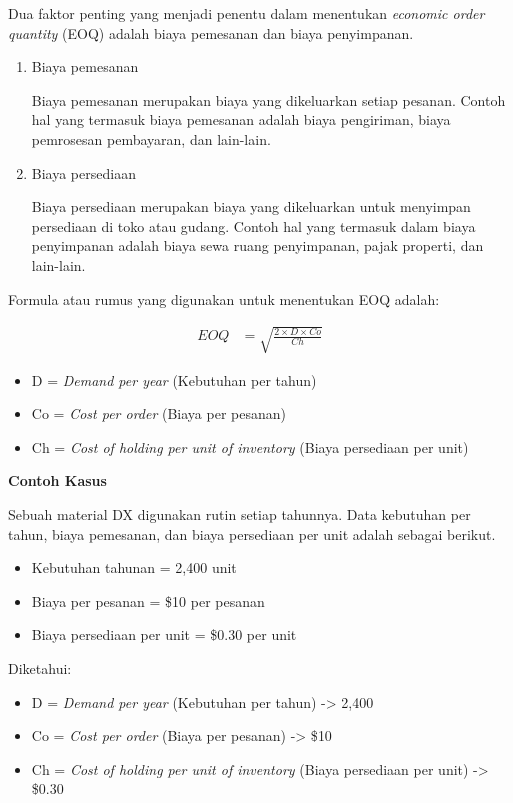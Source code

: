 Dua faktor penting yang menjadi penentu dalam menentukan \textit{economic order quantity} (EOQ) adalah biaya pemesanan dan biaya penyimpanan.

\begin{enumerate}
	\item Biaya pemesanan
	
	Biaya pemesanan merupakan biaya yang dikeluarkan setiap pesanan. Contoh hal yang termasuk biaya pemesanan adalah biaya pengiriman, biaya pemrosesan pembayaran, dan lain-lain.

	\item Biaya persediaan
	
	Biaya persediaan merupakan biaya yang dikeluarkan untuk menyimpan persediaan di toko atau gudang. Contoh hal yang termasuk dalam biaya penyimpanan adalah biaya sewa ruang penyimpanan, pajak properti, dan lain-lain.
\end{enumerate}

Formula atau rumus yang digunakan untuk menentukan EOQ adalah:

\begin{equation}
    \begin{split}
		EOQ
		&= \sqrt{\frac{2 \times D \times Co}{Ch}}
    \end{split}
\end{equation}

\begin{itemize}
	\item D = \textit{Demand per year} (Kebutuhan per tahun)
	\item Co = \textit{Cost per order} (Biaya per pesanan)
	\item Ch = \textit{Cost of holding per unit of inventory} (Biaya persediaan per unit)
\end{itemize}

\textbf{Contoh Kasus}

Sebuah material DX digunakan rutin setiap tahunnya. Data kebutuhan per tahun, biaya pemesanan, dan biaya persediaan per unit adalah sebagai berikut.

\begin{itemize}
	\item Kebutuhan tahunan = 2,400 unit
	\item Biaya per pesanan = \${10} per pesanan
	\item Biaya persediaan per unit = \${0.30} per unit
\end{itemize}

Diketahui:
\begin{itemize}
	\item D = \textit{Demand per year} (Kebutuhan per tahun) -> 2,400
	\item Co = \textit{Cost per order} (Biaya per pesanan) -> \${10}
	\item Ch = \textit{Cost of holding per unit of inventory} (Biaya persediaan per unit) -> \${0.30}
\end{itemize}

